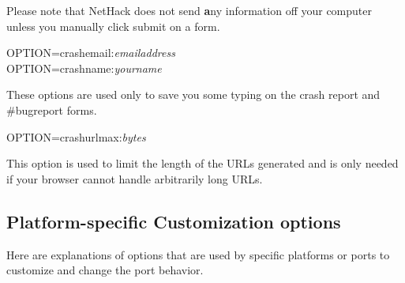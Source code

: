\documentclass[titlepage]{article}
\begin{document}
Please note that NetHack does not send {\textbf any} information off your
computer unless you manually click submit on a form.
\begin{description}
\item[OPTION=crash\textunderscore email:\textit{email\textunderscore address}]
\item[OPTION=crash\textunderscore name:\textit{your\textunderscore name}]
\end{description}
These options are used only to save you some typing on the crash
report and \#bugreport forms.  
\begin{description}
\item[OPTION=crash\textunderscore urlmax:\textit{bytes}]
\end{description}
This option is used to limit the length of the URLs generated and is only
needed if your browser cannot handle arbitrarily long URLs.

\subsection*{Platform-specific Customization options}

Here are explanations of options that are used by specific platforms
or ports to customize and change the port behavior.
\end{document}
